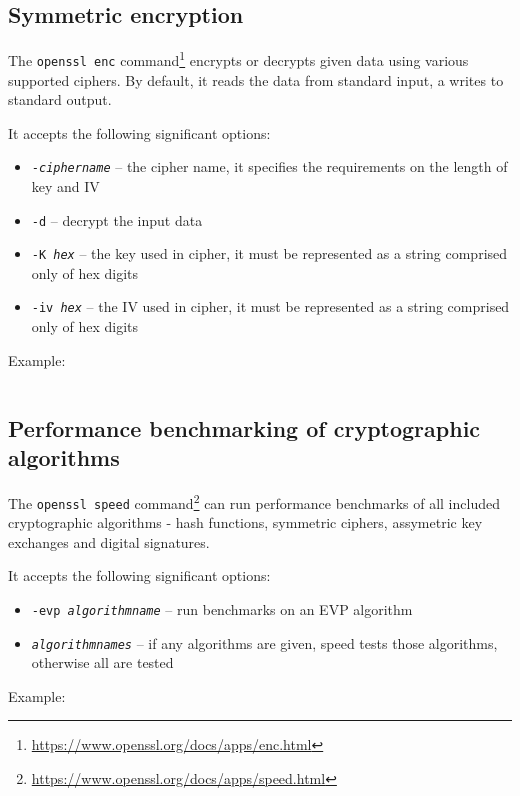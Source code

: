 \subsection{Symmetric encryption}

The \texttt{openssl enc} command\footnote{\url{https://www.openssl.org/docs/apps/enc.html}} encrypts or decrypts given data using various supported ciphers. By default, it reads the data from standard input, a writes to standard output.

It accepts the following significant options:

\begin{itemize}
  \item \texttt{-\textit{ciphername}} -- the cipher name, it specifies the requirements on the length of key and IV
  \item \texttt{-d} -- decrypt the input data
  \item \texttt{-K \textit{hex}} -- the key used in cipher, it must be represented as a string comprised only of hex digits
  \item \texttt{-iv \textit{hex}} -- the IV used in cipher, it must be represented as a string comprised only of hex digits
\end{itemize}

Example:

\inputminted{text}{code/openssl-enc-example.txt}


\subsection{Performance benchmarking of cryptographic algorithms}

The \texttt{openssl speed} command\footnote{\url{https://www.openssl.org/docs/apps/speed.html}} can run performance benchmarks of all included cryptographic algorithms - hash functions, symmetric ciphers, assymetric key exchanges and digital signatures.

It accepts the following significant options:

\begin{itemize}
  \item \texttt{-evp \textit{algorithmname}} -- run benchmarks on an EVP algorithm
  \item \texttt{\textit{algorithmnames}} -- if any algorithms are given, speed tests those algorithms, otherwise all are tested
\end{itemize}

Example:

